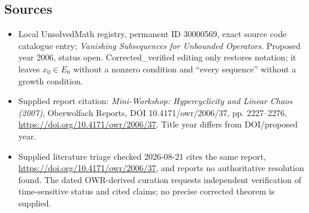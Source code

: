 \documentclass[11pt]{article}
\begin{document}
\subsection{Sources}
\begin{itemize}
\item Local UnsolvedMath registry, permanent ID 30000569, exact source code catalogue entry; \emph{Vanishing Subsequences for Unbounded Operators}. Proposed year 2006, status open. Corrected\_verified editing only restores notation; it leaves $x_0\in E_0$ without a nonzero condition and ``every sequence'' without a growth condition.
\item Supplied report citation: \emph{Mini-Workshop: Hypercyclicity and Linear Chaos (2007)}, Oberwolfach Reports, DOI 10.4171/owr/2006/37, pp. 2227--2276, \url{https://doi.org/10.4171/owr/2006/37}. Title year differs from DOI/proposed year.
\item Supplied literature triage checked 2026-08-21 cites the same report, \url{https://doi.org/10.4171/owr/2006/37}, and reports no authoritative resolution found. The dated OWR-derived curation requests independent verification of time-sensitive status and cited claims; no precise corrected theorem is supplied.
\end{itemize}
\end{document}
